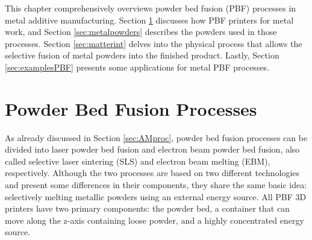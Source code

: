This chapter comprehensively overviews powder bed fusion (PBF) processes in metal additive manufacturing. Section \ref{sec:pbf_proc} discusses how PBF printers for metal work, and Section \ref{sec:metalpowders} describes the powders used in those processes. Section \ref{sec:matterint} delves into the physical process that allows the selective fusion of metal powders into the finished product. Lastly, Section \ref{sec:examplesPBF} presents some applications for metal PBF processes.

\section{Powder Bed Fusion Processes}\label{sec:pbf_proc}
As already discussed in Section \ref{sec:AMproc}, powder bed fusion processes can be divided into laser powder bed fusion and electron beam powder bed fusion, also called selective laser sintering (SLS) and electron beam melting (EBM), respectively. Although the two processes are based on two different technologies and present some differences in their components, they share the same basic idea: selectively melting metallic powders using an external energy source. All PBF 3D printers have two primary components: the powder bed, a container that can move along the z-axis containing loose powder, and a highly concentrated energy source. 

